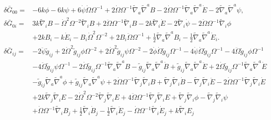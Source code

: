 \documentclass[10pt,letterpaper]{article}
\numberwithin{equation}{section}
\begin{document}
\begin{align}
\delta \bar G_{00}={}&-6 k \phi
 - 6 k \psi
 + 6 \dot{\psi} \dot{\Omega} \Omega^{-1}
 + 2 \dot{\Omega} \Omega^{-1} \tilde\nabla_{a}\tilde\nabla^{a}B
 - 2 \dot{\Omega} \Omega^{-1} \tilde\nabla_{a}\tilde\nabla^{a}\dot{E}
 - 2 \tilde\nabla_{a}\tilde\nabla^{a}\psi,
\nonumber\\
\delta \bar G_{0i}={}&3 k \tilde\nabla_{i}B
 -  \dot{\Omega}^2 \Omega^{-2} \tilde\nabla_{i}B
 + 2 \ddot{\Omega} \Omega^{-1} \tilde\nabla_{i}B
 - 2 k \tilde\nabla_{i}\dot{E}
 - 2 \tilde\nabla_{i}\dot{\psi}
 - 2 \dot{\Omega} \Omega^{-1} \tilde\nabla_{i}\phi
\nonumber\\
&+2 k B_{i}
 -  k \dot{E}_{i}
 -  B_{i} \dot{\Omega}^2 \Omega^{-2}
 + 2 B_{i} \ddot{\Omega} \Omega^{-1}
 + \tfrac{1}{2} \tilde\nabla_{a}\tilde\nabla^{a}B_{i}
 -  \tfrac{1}{2} \tilde\nabla_{a}\tilde\nabla^{a}\dot{E}_{i}.
\nonumber\\
\delta \bar G_{ij}={}&-2 \ddot{\psi} \tilde g_{ij}
 + 2 \dot{\Omega}^2 \tilde g_{ij} \phi \Omega^{-2}
 + 2 \dot{\Omega}^2 \tilde g_{ij} \psi \Omega^{-2}
 - 2 \dot{\phi} \dot{\Omega} \tilde g_{ij} \Omega^{-1}
 - 4 \dot{\psi} \dot{\Omega} \tilde g_{ij} \Omega^{-1}
 - 4 \ddot{\Omega} \tilde g_{ij} \phi \Omega^{-1}\nonumber\\
& - 4 \ddot{\Omega} \tilde g_{ij} \psi \Omega^{-1}
 - 2 \dot{\Omega} \tilde g_{ij} \Omega^{-1} \tilde\nabla_{a}\tilde\nabla^{a}B
 -  \tilde g_{ij} \tilde\nabla_{a}\tilde\nabla^{a}\dot{B}
 + \tilde g_{ij} \tilde\nabla_{a}\tilde\nabla^{a}\ddot{E}
 + 2 \dot{\Omega} \tilde g_{ij} \Omega^{-1} \tilde\nabla_{a}\tilde\nabla^{a}\dot{E}\nonumber\\
& -  \tilde g_{ij} \tilde\nabla_{a}\tilde\nabla^{a}\phi
 + \tilde g_{ij} \tilde\nabla_{a}\tilde\nabla^{a}\psi
 + 2 \dot{\Omega} \Omega^{-1} \tilde\nabla_{j}\tilde\nabla_{i}B
 + \tilde\nabla_{j}\tilde\nabla_{i}\dot{B}
 -  \tilde\nabla_{j}\tilde\nabla_{i}\ddot{E}
 - 2 \dot{\Omega} \Omega^{-1} \tilde\nabla_{j}\tilde\nabla_{i}\dot{E}\nonumber\\
& + 2 k \tilde\nabla_{j}\tilde\nabla_{i}E
 - 2 \dot{\Omega}^2 \Omega^{-2} \tilde\nabla_{j}\tilde\nabla_{i}E
 + 4 \ddot{\Omega} \Omega^{-1} \tilde\nabla_{j}\tilde\nabla_{i}E
 + \tilde\nabla_{j}\tilde\nabla_{i}\phi
 -  \tilde\nabla_{j}\tilde\nabla_{i}\psi
\nonumber\\
& +\dot{\Omega} \Omega^{-1} \tilde\nabla_{i}B_{j}
 + \tfrac{1}{2} \tilde\nabla_{i}\dot{B}_{j}
 -  \tfrac{1}{2} \tilde\nabla_{i}\ddot{E}_{j}
 -  \dot{\Omega} \Omega^{-1} \tilde\nabla_{i}\dot{E}_{j}
 + k \tilde\nabla_{i}E_{j}

\end{align}
\end{document}

